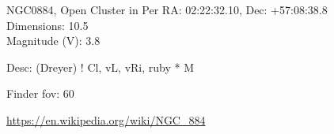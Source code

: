 \begin{block}{NGC0884, Open Cluster in Per}
    RA: 02:22:32.10, Dec: +57:08:38.8 \\ 
    Dimensions: 10.5 \\ 
    Magnitude (V): 3.8


    Desc: (Dreyer) ! Cl, vL, vRi, ruby * M 

    Finder fov: 60 

    \url{https://en.wikipedia.org/wiki/NGC_884} 
\end{block}